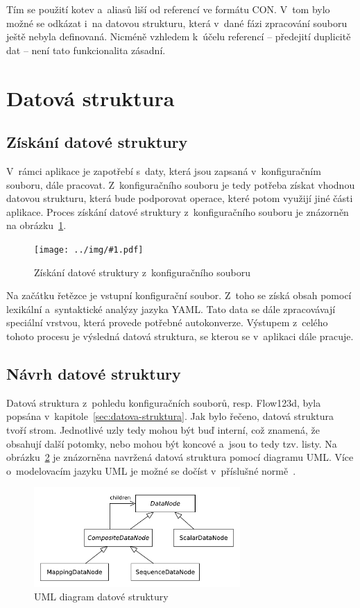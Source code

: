 \documentclass[FM,bw,DP]{tulthesis}
\newcommand{\includeimg}[2]{%
\begin{figure}[h]
	\centering
    \texttt{[image: ../img/\#1.pdf]}
    \caption{#2}
	\label{img:#1}
\end{figure}
}
\begin{document}
Tím se použití kotev a~aliasů liší od referencí ve formátu \gls{CON}. V~tom bylo možné se odkázat i~na datovou strukturu, která v~dané fázi zpracování souboru ještě nebyla definovaná. Nicméně vzhledem k~účelu referencí -- předejití duplicitě dat -- není tato funkcionalita zásadní. 


\section{Datová struktura}

\subsection{Získání datové struktury}

V~rámci aplikace je zapotřebí s~daty, která jsou zapsaná v~konfiguračním souboru, dále pracovat. Z~konfiguračního souboru je tedy potřeba získat vhodnou datovou strukturu, která bude podporovat operace, které potom využijí jiné části aplikace. Proces získání datové struktury z~konfiguračního souboru je znázorněn na obrázku~\ref{img:data_structure_chain}.

\includeimg{data_structure_chain}{Získání datové struktury z~konfiguračního souboru}

Na začátku řetězce je vstupní konfigurační soubor. Z~toho se získá obsah pomocí lexikální a~syntaktické analýzy jazyka \gls{YAML}. Tato data se dále zpracovávají speciální vrstvou, která provede potřebné autokonverze. Výstupem z~celého tohoto procesu je výsledná datová struktura, se kterou se v~aplikaci dále pracuje.

\subsection{Návrh datové struktury}

Datová struktura z~pohledu konfiguračních souborů, resp. Flow123d, byla popsána v~kapitole~\ref{sec:datova-struktura}. Jak bylo řečeno, datová struktura tvoří strom. Jednotlivé uzly tedy mohou být buď interní, což znamená, že obsahují další potomky, nebo mohou být koncové a~jsou to tedy tzv. listy. Na obrázku~\ref{img:data_node} je znázorněna navržená datová struktura pomocí diagramu \gls{UML}. Více o~modelovacím jazyku \gls{UML} je možné se dočíst v~příslušné normě~\cite{bib:uml}.

\begin{figure}[h]
	\centering
    \includegraphics[width=0.7\textwidth]{../img/data_node.pdf}
    \caption{UML diagram datové struktury}
	\label{img:data_node}
\end{figure}
\end{document}
